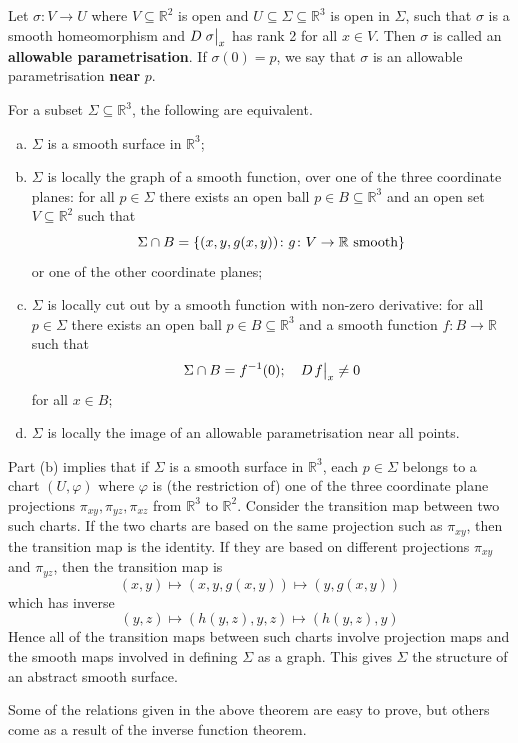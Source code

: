 \documentclass[a4paper]{article}
\begin{document}
\begin{definition}
	Let \( \sigma \colon V \to U \) where \( V \subseteq \mathbb R^2 \) is open and \( U \subseteq \Sigma \subseteq \mathbb R^3 \) is open in \( \Sigma \), such that \( \sigma \) is a smooth homeomorphism and \( D \eval{\sigma}_x \) has rank 2 for all \( x \in V \).
	Then \( \sigma \) is called an \textbf{allowable parametrisation}.
	If \( \sigma(0) = p \), we say that \( \sigma \) is an allowable parametrisation \textbf{near} \( p \).
\end{definition}
\begin{theorem}
	For a subset \( \Sigma \subseteq \mathbb R^3 \), the following are equivalent.
	\begin{enumerate}[(a)]
		\item \( \Sigma \) is a smooth surface in \( \mathbb R^3 \);
		\item \( \Sigma \) is locally the graph of a smooth function, over one of the three coordinate planes: for all \( p \in \Sigma \) there exists an open ball \( p \in B \subseteq \mathbb R^3 \) and an open set \( V \subseteq \mathbb R^2 \) such that
		      \[
			      \Sigma \cap B = \qty{(x, y, g(x,y)) \colon g \colon V \to \mathbb R \text{ smooth}}
		      \]
		      or one of the other coordinate planes;
		\item \( \Sigma \) is locally cut out by a smooth function with non-zero derivative: for all \( p \in \Sigma \) there exists an open ball \( p \in B \subseteq \mathbb R^3 \) and a smooth function \( f \colon B \to \mathbb R \) such that
		      \[
			      \Sigma \cap B = f^{-1}(0);\quad D \teval{f}{x} \neq 0
		      \]
		      for all \( x \in B \);
		\item \( \Sigma \) is locally the image of an allowable parametrisation near all points.
	\end{enumerate}
\end{theorem}
\begin{remark}
	Part (b) implies that if \( \Sigma \) is a smooth surface in \( \mathbb R^3 \), each \( p \in \Sigma \) belongs to a chart \( (U, \varphi) \) where \( \varphi \) is (the restriction of) one of the three coordinate plane projections \( \pi_{xy}, \pi_{yz}, \pi_{xz} \) from \( \mathbb R^3 \) to \( \mathbb R^2 \).
	Consider the transition map between two such charts.
	If the two charts are based on the same projection such as \( \pi_{xy} \), then the transition map is the identity.
	If they are based on different projections \( \pi_{xy} \) and \( \pi_{yz} \), then the transition map is
	\[
		(x,y) \mapsto (x,y,g(x,y)) \mapsto (y,g(x,y))
	\]
	which has inverse
	\[
		(y,z) \mapsto (h(y,z),y,z) \mapsto (h(y,z),y)
	\]
	Hence all of the transition maps between such charts involve projection maps and the smooth maps involved in defining \( \Sigma \) as a graph.
	This gives \( \Sigma \) the structure of an abstract smooth surface.
\end{remark}
Some of the relations given in the above theorem are easy to prove, but others come as a result of the inverse function theorem.
\end{document}
